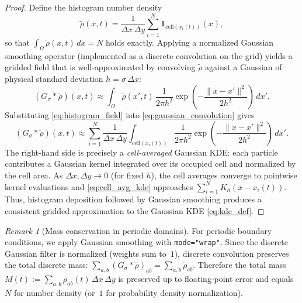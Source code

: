 \documentclass{report}
\theoremstyle{plain}
\theoremstyle{remark}
\newtheorem{remark}[theorem]{Remark}
\numberwithin{equation}{section}              %
\begin{document}
\begin{proof}
Define the histogram number density
\begin{equation}
\tilde\rho(x,t)
=
\frac{1}{\Delta x\,\Delta y}\sum_{i=1}^N \mathbf{1}_{\mathrm{cell}(x_i(t))}(x),
\label{eq:histogram_field}
\end{equation}
so that $\int_\Omega \tilde\rho(x,t)\,dx = N$ holds exactly.
Applying a normalized Gaussian smoothing operator (implemented as a discrete convolution on the grid) yields a gridded field that is well-approximated by convolving $\tilde\rho$ against a Gaussian of physical standard deviation $h=\sigma\,\Delta x$:
\begin{equation}
(G_\sigma * \tilde\rho)(x,t)
\approx
\int_\Omega \tilde\rho(x',t)\,
\frac{1}{2\pi h^2}\exp\!\left(-\frac{\|x-x'\|^2}{2h^2}\right)\,dx'.
\label{eq:gaussian_convolution}
\end{equation}
Substituting \eqref{eq:histogram_field} into \eqref{eq:gaussian_convolution} gives
\begin{equation}
(G_\sigma * \tilde\rho)(x,t)
\approx
\sum_{i=1}^N \frac{1}{\Delta x\,\Delta y}
\int_{\mathrm{cell}(x_i(t))}
\frac{1}{2\pi h^2}\exp\!\left(-\frac{\|x-x'\|^2}{2h^2}\right)\,dx'.
\label{eq:cell_avg_kde}
\end{equation}
The right-hand side is precisely a \emph{cell-averaged} Gaussian KDE: each particle contributes a Gaussian kernel integrated over its occupied cell and normalized by the cell area.
As $\Delta x,\Delta y\to 0$ (for fixed $h$), the cell averages converge to pointwise kernel evaluations and \eqref{eq:cell_avg_kde} approaches $\sum_{i=1}^N K_h(x-x_i(t))$.
Thus, histogram deposition followed by Gaussian smoothing produces a consistent gridded approximation to the Gaussian KDE \eqref{eq:kde_def}.
\end{proof}

\begin{remark}[Mass conservation in periodic domains]
\label{rem:kde_mass}
For periodic boundary conditions, we apply Gaussian smoothing with \texttt{mode="wrap"}.
Since the discrete Gaussian filter is normalized (weights sum to~$1$), discrete convolution preserves the total discrete mass: $\sum_{a,b} (G_\sigma * \tilde\rho)_{ab} = \sum_{a,b} \tilde\rho_{ab}$. Therefore the total mass $M(t) := \sum_{a,b} \rho_{ab}(t)\,\Delta x\,\Delta y$ is preserved up to floating-point error and equals $N$ for number density (or~$1$ for probability density normalization).
\end{remark}
\end{document}
